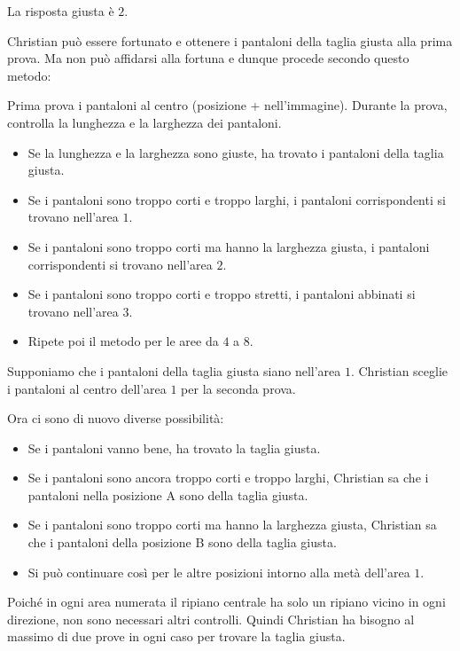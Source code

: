 \documentclass[a4paper,11pt]{report}
\newcommand{\taskGraphicsFolder}{..}
\begin{document}
La risposta giusta è $2$.

Christian può essere fortunato e ottenere i pantaloni della taglia giusta alla prima prova. Ma non può affidarsi alla fortuna e dunque procede secondo questo metodo:

Prima prova i pantaloni al centro (posizione + nell’immagine). Durante la prova, controlla la lunghezza e la larghezza dei pantaloni.

\begin{itemize}
  \item Se la lunghezza e la larghezza sono giuste, ha trovato i pantaloni della taglia giusta.
  \item Se i pantaloni sono troppo corti e troppo larghi, i pantaloni corrispondenti si trovano nell’area $1$.
  \item Se i pantaloni sono troppo corti ma hanno la larghezza giusta, i pantaloni corrispondenti si trovano nell’area $2$.
  \item Se i pantaloni sono troppo corti e troppo stretti, i pantaloni abbinati si trovano nell’area $3$.
  \item Ripete poi il metodo per le aree da $4$ a $8$.
\end{itemize}

{\centering%
\par}

Supponiamo che i pantaloni della taglia giusta siano nell’area $1$. Christian sceglie i pantaloni al centro dell’area $1$ per la seconda prova.

Ora ci sono di nuovo diverse possibilità:

\begin{itemize}
  \item Se i pantaloni vanno bene, ha trovato la taglia giusta.
  \item Se i pantaloni sono ancora troppo corti e troppo larghi, Christian sa che i pantaloni nella posizione A sono della taglia giusta.
  \item Se i pantaloni sono troppo corti ma hanno la larghezza giusta, Christian sa che i pantaloni della posizione B sono della taglia giusta.
  \item Si può continuare così per le altre posizioni intorno alla metà dell’area $1$.
\end{itemize}

Poiché in ogni area numerata il ripiano centrale ha solo un ripiano vicino in ogni direzione, non sono necessari altri controlli. Quindi Christian ha bisogno al massimo di due prove in ogni caso per trovare la taglia giusta.
\end{document}

